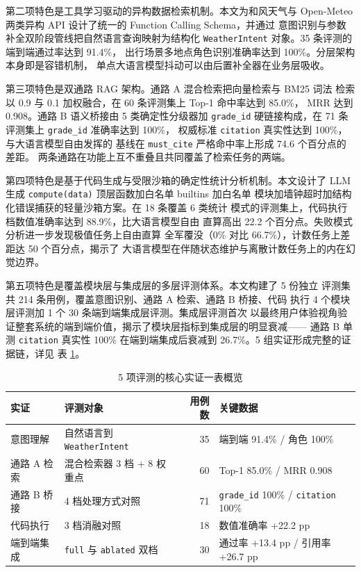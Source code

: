 \documentclass[a4paper]{article}
\newcommand{\song}{\CJKfamily{song}}
\theoremstyle{definition}
\theoremstyle{plain}
\theoremstyle{remark}
\newcommand{\reftab}[1]{表 \ref{#1}}
\newcommand{\bk}{\discretionary{}{}{}}
\begin{document}
第二项特色是工具学习驱动的异构数据检索机制。本文为和风天气与
Open-Meteo 两类异构 API 设计了统一的 Function Calling Schema，并通过
意图识别与参数补全双阶段管线把自然语言查询映射为结构化
\texttt{WeatherIntent} 对象。35 条评测的端到端通过率达到 91.4\%，
出行场景多地点角色识别准确率达到 100\%。分层架构本身即是容错机制，
单点大语言模型抖动可以由后置补全器在业务层吸收。

第三项特色是双通路 RAG 架构。通路 A 混合检索把向量检索与 BM25 词法
检索以 0.9 与 0.1 加权融合，在 60 条评测集上 Top-1 命中率达到 85.0\%，
MRR 达到 0.908。通路 B 语义桥接由 5 类确定性分级器加 \texttt{grade\_\bk{}id}
硬链接构成，在 71 条评测集上 \texttt{grade\_\bk{}id} 准确率达到 100\%，
权威标准 \texttt{citation} 真实性达到 100\%，与大语言模型自由发挥的
基线在 \texttt{must\_\bk{}cite} 严格命中率上形成 74.6 个百分点的差距。
两条通路在功能上互不重叠且共同覆盖了检索任务的两端。

第四项特色是基于代码生成与受限沙箱的确定性统计分析机制。本文设计了
LLM 生成 \texttt{compute(data)} 顶层函数加白名单 builtins 加白名单
模块加墙钟超时加结构化错误捕获的轻量沙箱方案。在 18 条覆盖 6 类统计
模式的评测集上，代码执行档数值准确率达到 88.9\%，比大语言模型自由
直算高出 22.2 个百分点。失败模式分析进一步发现极值任务上自由直算
全军覆没（0\% 对比 66.7\%），计数任务上差距达 50 个百分点，揭示了
大语言模型在伴随状态维护与离散计数任务上的内在幻觉边界。

第五项特色是覆盖模块层与集成层的多层评测体系。本文构建了 5 份独立
评测集共 214 条用例，覆盖意图识别、通路 A 检索、通路 B 桥接、代码
执行 4 个模块层评测加 1 个 30 条端到端集成层评测。集成层评测首次
以最终用户体验视角验证整套系统的端到端价值，揭示了模块层指标到集成层的明显衰减——
通路 B 单测 \texttt{citation} 真实性 100\% 在端到端集成后衰减到
26.7\%。5 组实证形成完整的证据链，详见 \reftab{tab:evidence-summary}。

\begin{table}[H]
    \centering
    \caption{5 项评测的核心实证一表概览}
    \label{tab:evidence-summary}
    \song\fontsize{9pt}{12pt}\selectfont
    \renewcommand{\arraystretch}{0.95}
    \begin{tabular}{llrl}
        \toprule
        实证 & 评测对象 & 用例数 & 关键数据 \\
        \midrule
        意图理解 & 自然语言到 \texttt{WeatherIntent} & 35 & 端到端 91.4\% / 角色 100\% \\
        通路 A 检索 & 混合检索器 3 档 + 8 权重点 & 60 & Top-1 85.0\% / MRR 0.908 \\
        通路 B 桥接 & 4 档处理方式对照 & 71 & \texttt{grade\_\bk{}id} 100\% / \texttt{citation} 100\% \\
        代码执行 & 3 档消融对照 & 18 & 数值准确率 +22.2 pp \\
        端到端集成 & \texttt{full} 与 \texttt{ablated} 双档 & 30 & 通过率 +13.4 pp / 引用率 +26.7 pp \\
        \bottomrule
    \end{tabular}
\end{table}
\end{document}
